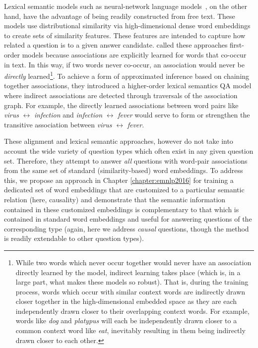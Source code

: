 Lexical semantic models such as neural-network language models~\citep{jansen14,sultan-etal:2014:TACL,yih13}, on the other hand, have the advantage of being readily constructed from free text.  These models use distributional similarity via high-dimensional dense word embeddings to create sets of similarity features.  These features are intended to capture how related a question is to a given answer candidate.  
\citet{fried2015higher} called these approaches first-order models because associations are explicitly learned for words that co-occur in text.  In this way, if two words never co-occur, an association would never be \emph{directly} learned\footnote{While two words which never occur together would never have an association directly learned by the model, indirect learning takes place (which is, in a large part, what makes these models so robust).  That is, during the training process, words which occur with similar context words are indirectly drawn closer together in the high-dimensional embedded space as they are each independently drawn closer to their overlapping context words.  For example, words like \emph{dog} and \emph{platypus} will each be independently drawn closer to a common context word like \emph{eat}, inevitably resulting in them being indirectly drawn closer to each other.}.   To achieve a form of approximated inference based on chaining together associations, they introduced a higher-order lexical semantics QA model where indirect associations are detected through traversals of the association graph.  For example, the directly learned associations between word pairs like \textit{virus} $\leftrightarrow$ \textit{infection} and \textit{infection} $\leftrightarrow$ \textit{fever} would serve to form or strengthen the transitive association between \textit{virus} $\leftrightarrow$ \textit{fever}. 

These alignment and lexical semantic approaches, however do not take into account the wide variety of question types which often exist in any given question set.  Therefore, they attempt to answer \emph{all} questions with word-pair associations from the same set of standard (similarity-based) word embeddings.  To address this, we propose an approach in Chapter \ref{chapter:emnlp2016} for training a dedicated set of word embeddings that are customized to a particular semantic relation (here, causality) and demonstrate that the semantic information contained in these customized embeddings is complementary to that which is contained in standard word embeddings and useful for answering questions of the corresponding type (again, here we address \textit{causal} questions, though the method is readily extendable to other question types).

